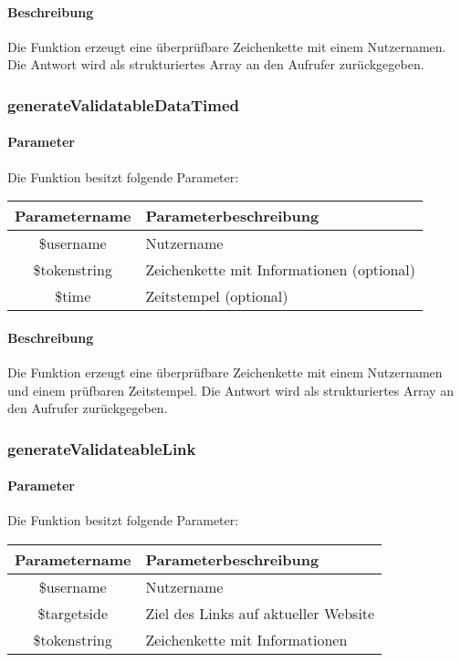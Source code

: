 \paragraph{Beschreibung} Die Funktion erzeugt eine überprüfbare Zeichenkette mit einem Nutzernamen. Die Antwort wird als strukturiertes Array an den Aufrufer zurückgegeben.
\subsubsection{generateValidatableDataTimed}
\paragraph{Parameter} Die Funktion besitzt folgende Parameter:
\begin{table}[H]
	\begin{tabular}{|c|p{11cm}|}
		\hline
		\textbf{Parametername} & \textbf{Parameterbeschreibung} \\ \hline
		\$username    & Nutzername \\ \hline
		\$tokenstring & Zeichenkette mit Informationen (optional) \\ \hline
		\$time        & Zeitstempel (optional) \\ \hline
	\end{tabular}
\end{table}
\paragraph{Beschreibung} Die Funktion erzeugt eine überprüfbare Zeichenkette mit einem Nutzernamen und einem prüfbaren Zeitstempel. Die Antwort wird als strukturiertes Array an den Aufrufer zurückgegeben.\textbf{}
\subsubsection{generateValidateableLink}
\paragraph{Parameter} Die Funktion besitzt folgende Parameter:
\begin{table}[H]
	\begin{tabular}{|c|p{11cm}|}
		\hline
		\textbf{Parametername} & \textbf{Parameterbeschreibung} \\ \hline
		\$username    & Nutzername \\ \hline
		\$targetside  & Ziel des Links auf aktueller Website \\ \hline
		\$tokenstring & Zeichenkette mit Informationen \\ \hline
	\end{tabular}
\end{table}
